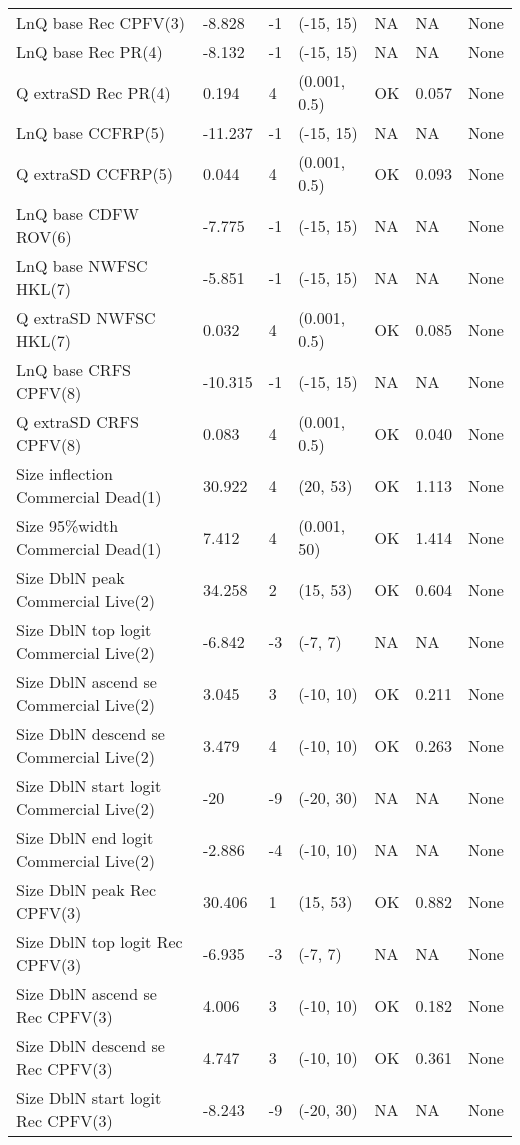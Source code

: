 \documentclass[11pt,
  english,
  letterpaper,
]{article}
\begin{document}
\begin{landscape}
\begin{longtable}[t]{>{\raggedright\arraybackslash}p{7.5cm}lllll>{\raggedright\arraybackslash}p{3.5cm}}
LnQ base Rec CPFV(3) & -8.828 & -1 & (-15, 15) & NA & NA & None\\
LnQ base Rec PR(4) & -8.132 & -1 & (-15, 15) & NA & NA & None\\
Q extraSD Rec PR(4) & 0.194 & 4 & (0.001, 0.5) & OK & 0.057 & None\\
LnQ base CCFRP(5) & -11.237 & -1 & (-15, 15) & NA & NA & None\\
Q extraSD CCFRP(5) & 0.044 & 4 & (0.001, 0.5) & OK & 0.093 & None\\
LnQ base CDFW ROV(6) & -7.775 & -1 & (-15, 15) & NA & NA & None\\
LnQ base NWFSC HKL(7) & -5.851 & -1 & (-15, 15) & NA & NA & None\\
Q extraSD NWFSC HKL(7) & 0.032 & 4 & (0.001, 0.5) & OK & 0.085 & None\\
LnQ base CRFS CPFV(8) & -10.315 & -1 & (-15, 15) & NA & NA & None\\
Q extraSD CRFS CPFV(8) & 0.083 & 4 & (0.001, 0.5) & OK & 0.040 & None\\
Size inflection Commercial Dead(1) & 30.922 & 4 & (20, 53) & OK & 1.113 & None\\
Size 95\%width Commercial Dead(1) & 7.412 & 4 & (0.001, 50) & OK & 1.414 & None\\
Size DblN peak Commercial Live(2) & 34.258 & 2 & (15, 53) & OK & 0.604 & None\\
Size DblN top logit Commercial Live(2) & -6.842 & -3 & (-7, 7) & NA & NA & None\\
Size DblN ascend se Commercial Live(2) & 3.045 & 3 & (-10, 10) & OK & 0.211 & None\\
Size DblN descend se Commercial Live(2) & 3.479 & 4 & (-10, 10) & OK & 0.263 & None\\
Size DblN start logit Commercial Live(2) & -20 & -9 & (-20, 30) & NA & NA & None\\
Size DblN end logit Commercial Live(2) & -2.886 & -4 & (-10, 10) & NA & NA & None\\
Size DblN peak Rec CPFV(3) & 30.406 & 1 & (15, 53) & OK & 0.882 & None\\
Size DblN top logit Rec CPFV(3) & -6.935 & -3 & (-7, 7) & NA & NA & None\\
Size DblN ascend se Rec CPFV(3) & 4.006 & 3 & (-10, 10) & OK & 0.182 & None\\
Size DblN descend se Rec CPFV(3) & 4.747 & 3 & (-10, 10) & OK & 0.361 & None\\
Size DblN start logit Rec CPFV(3) & -8.243 & -9 & (-20, 30) & NA & NA & None\\

\end{longtable}
\end{landscape}
\end{document}
